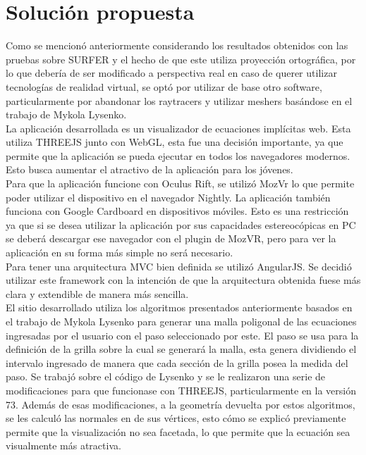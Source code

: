 \documentclass[12pt]{article}
\begin{document}
\section{Solución propuesta}
Como se mencionó anteriormente considerando los resultados obtenidos con las pruebas sobre SURFER  y el hecho de que este utiliza proyección ortográfica, por lo que debería de ser modificado a perspectiva real en caso de querer utilizar tecnologías de realidad virtual, se optó por utilizar de base otro software, particularmente por abandonar los raytracers y utilizar meshers basándose en el trabajo de Mykola Lysenko.
\\La aplicación desarrollada es un visualizador de ecuaciones implícitas web. Esta utiliza THREEJS junto con WebGL, esta fue una decisión importante, ya que permite que la aplicación se pueda ejecutar en todos los navegadores modernos. Esto busca  aumentar el atractivo de la aplicación para los jóvenes.
\\Para que la aplicación funcione con Oculus Rift, se utilizó MozVr lo que permite poder utilizar el dispositivo en el navegador Nightly. La aplicación también funciona con Google Cardboard en dispositivos móviles. Esto es una restricción ya que si se desea utilizar la aplicación por sus capacidades estereocópicas en PC se deberá descargar ese navegador con el plugin de MozVR, pero para ver la aplicación en su forma más simple no será necesario.
\\ Para tener una arquitectura MVC bien definida se utilizó AngularJS. Se decidió utilizar este framework con la intención de que la arquitectura obtenida fuese más clara y extendible de manera más sencilla.
\\El sitio desarrollado utiliza los algoritmos presentados anteriormente basados en el trabajo de Mykola Lysenko\cite{mykola1}\cite{mykola2} para generar una malla poligonal de las ecuaciones ingresadas por el usuario con el paso seleccionado por este. El paso se usa para la definición de la grilla sobre la cual se generará la malla, esta genera dividiendo el intervalo ingresado de manera que cada sección de la grilla posea la medida del paso. Se trabajó sobre el código de Lysenko y se le realizaron una serie de modificaciones para que funcionase con THREEJS, particularmente en la versión 73. Además de esas modificaciones, a la geometría devuelta por estos algoritmos, se les calculó las normales en de sus vértices, esto cómo se explicó previamente permite que la visualización no sea facetada, lo que permite que la ecuación sea visualmente más atractiva. 
\end{document}
